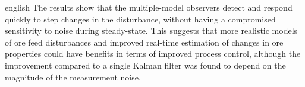 \begin{otherlanguage*}{english}
The results show that the multiple-model observers detect and respond quickly to step changes in the disturbance, without having a compromised sensitivity to noise during steady-state. This suggests that more realistic models of ore feed disturbances and improved real-time estimation of changes in ore properties could have benefits in terms of improved process control, although the improvement compared to a single Kalman filter was found to depend on the magnitude of the measurement noise.
\end{otherlanguage*}
